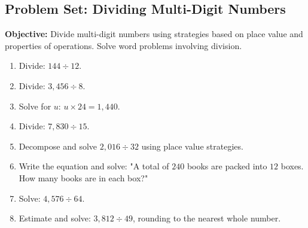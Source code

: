\documentclass[12pt]{article}
\title{}
\date{}
\begin{document}
\subsection*{Problem Set: Dividing Multi-Digit Numbers}
\onehalfspacing

\begin{tcolorbox}[colframe=black!40, colback=gray!5, 
coltitle=black, colbacktitle=black!20, fonttitle=\bfseries\Large, 
title=Learning Objective, halign title=center, left=1pt, right=1pt, top=5pt, bottom=15pt]
\textbf{Objective:} Divide multi-digit numbers using strategies based on place value and properties of operations. Solve word problems involving division.
\end{tcolorbox}

\begin{tcolorbox}[colframe=black!60, colback=white, 
coltitle=black, colbacktitle=black!15, fonttitle=\bfseries\Large, 
title=Exercises, halign title=center, left=10pt, right=10pt, top=10pt, bottom=20pt]
\begin{enumerate}[itemsep=2em]
    \item Divide: \( 144 \div 12 \). 
    \item Divide: \( 3,456 \div 8 \). %
    \item Solve for \( u \): \( u \times 24 = 1,440 \). \vspace{1cm}
    \item Divide: \( 7,830 \div 15 \). \vspace{1cm}
    \item Decompose and solve \( 2,016 \div 32 \) using place value strategies. \vspace{1cm}
    \item Write the equation and solve: "A total of \( 240 \) books are packed into \( 12 \) boxes. How many books are in each box?" \vspace{1cm}
    \item Solve: \( 4,576 \div 64 \). \vspace{1cm}
    \item Estimate and solve: \( 3,812 \div 49 \), rounding to the nearest whole number. \vspace{1cm}
\end{enumerate}
\end{tcolorbox}

\vspace{1em}
\end{document}
